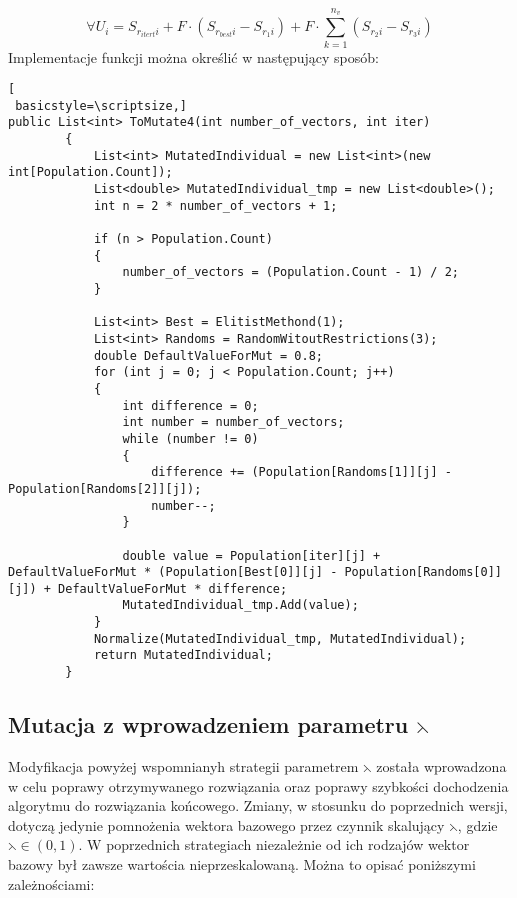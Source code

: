 $$
 \forall U_{i} = S_{r_{itert}i} +  F \cdot (S_{r_{best}i} - S_{r_{1}i}) +  F \cdot \sum_{k=1}^{n_{v}}(S_{r_{2}i} - S_{r_{3}i})
$$
Implementacje funkcji można określić w następujący sposób:
\begin{program}[h!]
\begin{lstlisting}[
 basicstyle=\scriptsize,]
public List<int> ToMutate4(int number_of_vectors, int iter)
        {
            List<int> MutatedIndividual = new List<int>(new int[Population.Count]);
            List<double> MutatedIndividual_tmp = new List<double>();
            int n = 2 * number_of_vectors + 1;

            if (n > Population.Count)
            {
                number_of_vectors = (Population.Count - 1) / 2;
            }

            List<int> Best = ElitistMethond(1);
            List<int> Randoms = RandomWitoutRestrictions(3);
            double DefaultValueForMut = 0.8;
            for (int j = 0; j < Population.Count; j++)
            {
                int difference = 0;
                int number = number_of_vectors;
                while (number != 0)
                {
                    difference += (Population[Randoms[1]][j] - Population[Randoms[2]][j]);
                    number--;
                }

                double value = Population[iter][j] + DefaultValueForMut * (Population[Best[0]][j] - Population[Randoms[0]][j]) + DefaultValueForMut * difference;
                MutatedIndividual_tmp.Add(value);
            }
            Normalize(MutatedIndividual_tmp, MutatedIndividual);
            return MutatedIndividual;
        }
\end{lstlisting}
\end{program}


\subsection{Mutacja z wprowadzeniem parametru $\leftthreetimes$} \label{sec:narzedzia}

Modyfikacja powyżej wspomnianyh strategii parametrem $\leftthreetimes$ została wprowadzona w celu poprawy otrzymywanego rozwiązania oraz poprawy szybkości dochodzenia algorytmu do rozwiązania końcowego. Zmiany, w stosunku do poprzednich wersji, dotyczą jedynie pomnożenia wektora bazowego przez czynnik skalujący $\leftthreetimes$, gdzie $\leftthreetimes \in (0,1)$. W poprzednich strategiach niezależnie od ich rodzajów wektor bazowy był zawsze wartościa nieprzeskalowaną. Można to opisać poniższymi zależnościami:\\

